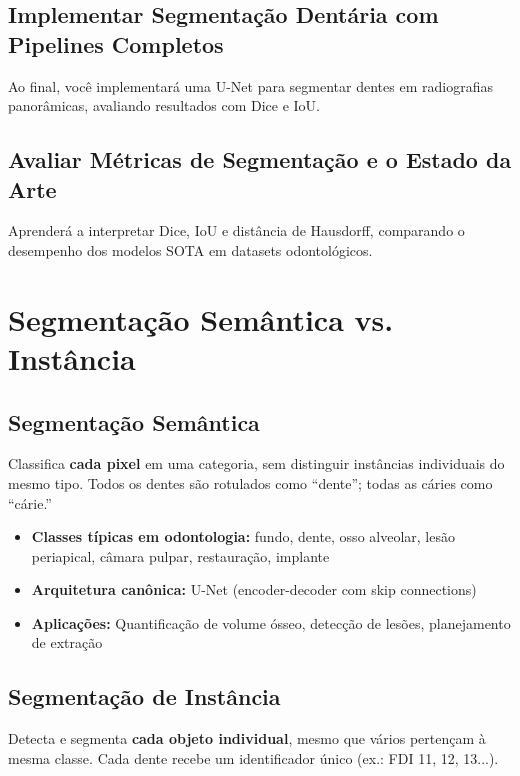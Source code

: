 \subsection{Implementar Segmentação Dentária com Pipelines Completos}
Ao final, você implementará uma U-Net para segmentar dentes em radiografias panorâmicas, avaliando resultados com Dice e IoU.

\subsection{Avaliar Métricas de Segmentação e o Estado da Arte}
Aprenderá a interpretar Dice, IoU e distância de Hausdorff, comparando o desempenho dos modelos SOTA em datasets odontológicos.

\section{Segmentação Semântica vs. Instância}
\label{sec:tipos-segmentacao}

\subsection{Segmentação Semântica}

Classifica \textbf{cada pixel} em uma categoria, sem distinguir instâncias
individuais do mesmo tipo. Todos os dentes são rotulados como ``dente'';
todas as cáries como ``cárie.''

\begin{itemize}
  \item \textbf{Classes típicas em odontologia:} fundo, dente, osso alveolar,
        lesão periapical, câmara pulpar, restauração, implante
  \item \textbf{Arquitetura canônica:} U-Net (encoder-decoder com skip connections)
  \item \textbf{Aplicações:} Quantificação de volume ósseo, detecção de lesões,
        planejamento de extração
\end{itemize}

\subsection{Segmentação de Instância}

Detecta e segmenta \textbf{cada objeto individual}, mesmo que vários pertençam
à mesma classe. Cada dente recebe um identificador único (ex.: FDI 11, 12, 13...).

